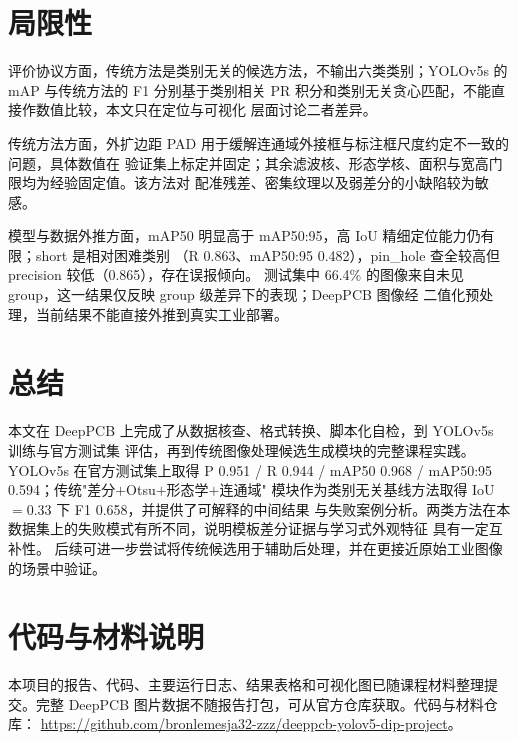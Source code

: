 \documentclass[UTF8,a4paper,zihao=5,twocolumn,fontset=fandol]{ctexart}
\begin{document}
\clearpage
\raggedbottom
\section{局限性}\label{sec:limits}

评价协议方面，传统方法是类别无关的候选方法，不输出六类类别；YOLOv5s 的 mAP 与传统方法的
F1 分别基于类别相关 PR 积分和类别无关贪心匹配，不能直接作数值比较，本文只在定位与可视化
层面讨论二者差异。

传统方法方面，外扩边距 PAD 用于缓解连通域外接框与标注框尺度约定不一致的问题，具体数值在
验证集上标定并固定；其余滤波核、形态学核、面积与宽高门限均为经验固定值。该方法对
配准残差、密集纹理以及弱差分的小缺陷较为敏感。

模型与数据外推方面，mAP50 明显高于 mAP50:95，高 IoU 精细定位能力仍有限；short 是相对困难类别
（R 0.863、mAP50:95 0.482），pin\_hole 查全较高但 precision 较低（0.865），存在误报倾向。
测试集中 66.4\% 的图像来自未见 group，这一结果仅反映 group 级差异下的表现；DeepPCB 图像经
二值化预处理，当前结果不能直接外推到真实工业部署。

\section{总结}\label{sec:concl}

本文在 DeepPCB 上完成了从数据核查、格式转换、脚本化自检，到 YOLOv5s 训练与官方测试集
评估，再到传统图像处理候选生成模块的完整课程实践。YOLOv5s 在官方测试集上取得
P 0.951 / R 0.944 / mAP50 0.968 / mAP50:95 0.594；传统"差分$+$Otsu$+$形态学$+$连通域"
模块作为类别无关基线方法取得 IoU$=$0.33 下 F1 0.658，并提供了可解释的中间结果
与失败案例分析。两类方法在本数据集上的失败模式有所不同，说明模板差分证据与学习式外观特征
具有一定互补性。
后续可进一步尝试将传统候选用于辅助后处理，并在更接近原始工业图像的场景中验证。

\section*{代码与材料说明}

本项目的报告、代码、主要运行日志、结果表格和可视化图已随课程材料整理提交。完整 DeepPCB
图片数据不随报告打包，可从官方仓库获取。代码与材料仓库：
\url{https://github.com/bronlemesja32-zzz/deeppcb-yolov5-dip-project}。

\label{page:refs}
\printbibliography[title={参考文献}]
\end{document}
